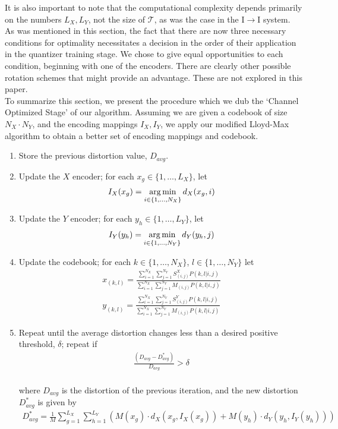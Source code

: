 It is also important to note that the computational complexity depends primarily on the numbers $L_X, L_Y$, not the size of $\mathcal T$, as was the case in the I$\rightarrow$I system.\\

As was mentioned in this section, the fact that there are now three necessary conditions for optimality necessitates a decision in the order of their application in the quantizer training stage. We chose to give equal opportunities to each condition, beginning with one of the encoders. There are clearly other possible rotation schemes that might provide an advantage. These are not explored in this paper.\\

To summarize this section, we present the procedure which we dub the `Channel Optimized Stage' of our algorithm. Assuming we are given a codebook of size $N_X\cdot N_Y$, and the encoding mappings $I_X, I_Y$, we apply our modified Lloyd-Max algorithm to obtain a better set of encoding mappings and codebook.\\

\begin{enumerate}
    \item Store the previous distortion value, $D_{avg}$.
    \item Update the $X$ encoder; for each $x_g\in \{1,\ldots,L_X\}$, let
    \begin{align}
        I_X(x_g)=\operatorname*{arg\,min}_{i\in\{1,\ldots,N_X\}}d_X(x_g,i)
    \end{align}
    \item Update the $Y$ encoder; for each $y_h\in \{1,\ldots,L_Y\}$, let
    \begin{align}
        I_Y(y_h)=\operatorname*{arg\,min}_{i\in\{1,\ldots,N_Y\}}d_Y(y_h,j)
    \end{align}
    \item Update the codebook; for each $k\in\{1,\ldots,N_X\}$, $l\in\{1,\ldots,N_Y\}$ let
    \begin{align}
        x_{(k,l)} = 
            \frac{\sum_{i=1}^{N_X} \sum_{j=1}^{N_Y}
            S_{(i,j)}^X P(k,l|i,j)}
            {\sum_{i=1}^{N_X} \sum_{j=1}^{N_Y}
            M_{(i,j)} P(k,l|i,j)}\\
        y_{(k,l)} = 
            \frac{\sum_{i=1}^{N_X} \sum_{j=1}^{N_Y}
            S_{(i,j)}^Y P(k,l|i,j)}
            {\sum_{i=1}^{N_X} \sum_{j=1}^{N_Y}
            M_{(i,j)} P(k,l|i,j)}
    \end{align}
    \item Repeat until the average distortion changes less than a desired positive threshold, $\delta$; repeat if
    \begin{align}
        \frac
        {(D_{avg} - D^*_{avg})}
        {D_{avg}}
        > \delta
    \end{align}
    \\
    where $D_{avg}$ is the distortion of the previous iteration, and the new distortion $D^*_{avg}$ is given by
    \begin{align}
        D^*_{avg}=\frac{1}{M}\sum_{g=1}^{L_X}\sum_{h=1}^{L_Y}\left(M(x_g)\cdot d_X(x_g,I_X(x_g))+M(y_h)\cdot d_Y(y_h,I_Y(y_h))\right)
    \end{align}
\end{enumerate}

